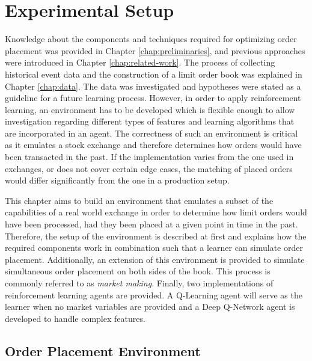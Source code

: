 \chapter{Experimental Setup}
\label{chap:setup}

Knowledge about the components and techniques required for optimizing order placement was provided in Chapter \ref{chap:preliminaries}, and previous approaches were introduced in Chapter \ref{chap:related-work}.
The process of collecting historical event data and the construction of a limit order book was explained in Chapter \ref{chap:data}.
The data was investigated and hypotheses were stated as a guideline for a future learning process.
However, in order to apply reinforcement learning, an environment has to be developed which is flexible enough to allow investigation regarding different types of features and learning algorithms that are incorporated in an agent.
The correctness of such an environment is critical as it emulates a stock exchange and therefore determines how orders would have been transacted in the past.
If the implementation varies from the one used in exchanges, or does not cover certain edge cases, the matching of placed orders would differ significantly from the one in a production setup.

This chapter aims to build an environment that emulates a subset of the capabilities of a real world exchange in order to determine how limit orders would have been processed, had they been placed at a given point in time in the past.
Therefore, the setup of the environment is described at first and explains how the required components work in combination such that a learner can simulate order placement.
Additionally, an extension of this environment is provided
to simulate simultaneous order placement on both sides of the book.
This process is commonly referred to as \textit{market making}.
Finally, two implementations of reinforcement learning agents are provided.
A Q-Learning agent will serve as the learner when no market variables are provided and a Deep Q-Network agent is developed to handle complex features.


\section{Order Placement Environment}
\label{sec:setup-order-placement}

